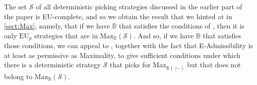 \documentclass[a4paper]{article}
\renewcommand\P{\mathbb{P}} %
\newcommand\Exp{\mathsf{Exp}}
\newcommand\EU{\mathrm{EU}}
\newcommand\U{\mathfrak{U}} %
\newcommand\Maximality{\mathrm{Max}}
\renewcommand\S{\mathcal{S}}
\newcommand\s{\mathsf{s}}
\newcommand{\n}{\mathsf{n}}
\newcommand{\IB}{\mathbb{B}}
\newcommand{\IP}{\P}
\newcommand{\todoold}[2][]{\todo[backgroundcolor=white,bordercolor=orange!10,linecolor=gray!10, #1,caption={},textcolor=gray]{Pre-rev: #2}}
\newcommand{\todooldinfo}[2][]{\todoold[#1]{#2}}
\newenvironment{CCM rewritten}
{\begingroup\color{blue}} %
{\endgroup}              %
\begin{document}
	
	

	

The set $\S$ of all deterministic picking strategies discussed in the earlier part of the paper is EU-complete, and so we obtain the result that we hinted at in \cref{sect:Max}, namely, that if we have $\IB$ that satisfies the conditions of , then it is only $\EU_p$ strategies that are in $\Maximality_\IB(\S)$. And so, if we have $\IB$ that satisfies those conditions, we can appeal to , together with the fact that E-Admissibility is at least as permissive as Maximality, to give sufficient conditions under which there is a deterministic strategy $\S$ that picks for $\Maximality_{\IB(\cdot|-)}$ but that does not belong to $\Maximality_\IB(\S)$.

\end{document}
